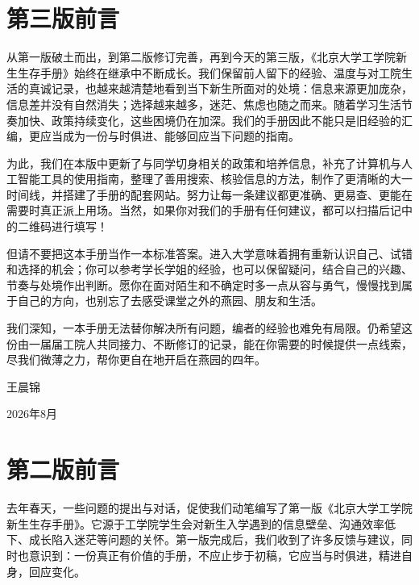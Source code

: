 
\chapter*{第三版前言}

从第一版破土而出，到第二版修订完善，再到今天的第三版，《北京大学工学院新生生存手册》始终在继承中不断成长。我们保留前人留下的经验、温度与对工院生活的真诚记录，也越来越清楚地看到当下新生所面对的处境：信息来源更加庞杂，信息差并没有自然消失；选择越来越多，迷茫、焦虑也随之而来。随着学习生活节奏加快、政策持续变化，这些困境仍在加深。我们的手册因此不能只是旧经验的汇编，更应当成为一份与时俱进、能够回应当下问题的指南。

\vspace{10pt}

为此，我们在本版中更新了与同学切身相关的政策和培养信息，补充了计算机与人工智能工具的使用指南，整理了善用搜索、核验信息的方法，制作了更清晰的大一时间线，并搭建了手册的配套网站。努力让每一条建议都更准确、更易查、更能在需要时真正派上用场。当然，如果你对我们的手册有任何建议，都可以扫描后记中的二维码进行填写！

\vspace{10pt}

但请不要把这本手册当作一本标准答案。进入大学意味着拥有重新认识自己、试错和选择的机会；你可以参考学长学姐的经验，也可以保留疑问，结合自己的兴趣、节奏与处境作出判断。愿你在面对陌生和不确定时多一点从容与勇气，慢慢找到属于自己的方向，也别忘了去感受课堂之外的燕园、朋友和生活。

\vspace{10pt}

我们深知，一本手册无法替你解决所有问题，编者的经验也难免有局限。仍希望这份由一届届工院人共同接力、不断修订的记录，能在你需要的时候提供一点线索，尽我们微薄之力，帮你更自在地开启在燕园的四年。

\begin{flushright}
	王晨锦
	
	2026年8月
\end{flushright}

\clearpage
\chapter*{第二版前言}

去年春天，一些问题的提出与对话，促使我们动笔编写了第一版《北京大学工学院新生生存手册》。它源于工学院学生会对新生入学遇到的信息壁垒、沟通效率低下、成长陷入迷茫等问题的关怀。第一版完成后，我们收到了许多反馈与建议，同时也意识到：一份真正有价值的手册，不应止步于初稿，它应当与时俱进，精进自身，回应变化。


